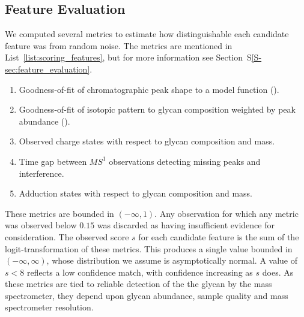 \subsection{Feature Evaluation}
    We computed several metrics to estimate
    how distinguishable each candidate feature was from random noise. The
    metrics are mentioned in List~\ref{list:scoring_features}, but for more
    information see Section~S\ref{S-sec:feature_evaluation}.
    \begin{ordlist}
    \begin{enumerate}
        \itemsep0em
        \caption{Chromatographic Feature Metrics\label{list:scoring_features}}
        \item Goodness-of-fit of chromatographic peak shape to a model function
              (\cite{Yu2010,Kronewitter2014}).
        \item Goodness-of-fit of isotopic pattern to glycan composition weighted
              by peak abundance (\cite{Maxwell2012}).
        \item Observed charge states with respect to glycan composition and mass.
        \item Time gap between $MS^1$ observations detecting missing peaks
              and interference.
        \item Adduction states with respect to glycan composition and mass.
    \end{enumerate}
    \end{ordlist}

    These metrics are bounded in $(-\infty, 1)$. Any observation for which any metric
    was observed below $0.15$ was discarded as having insufficient evidence for
    consideration. The observed score $s$ for each candidate feature is
    the sum of the logit-transformation of these metrics. This produces a single
    value bounded in $(-\infty, \infty)$, whose distribution we assume is asymptotically
    normal. A value of $s < 8$ reflects a low confidence match, with confidence increasing
    as $s$ does. As these metrics are tied to reliable detection of the the glycan
    by the mass spectrometer, they depend upon glycan abundance, sample quality and
    mass spectrometer resolution.
